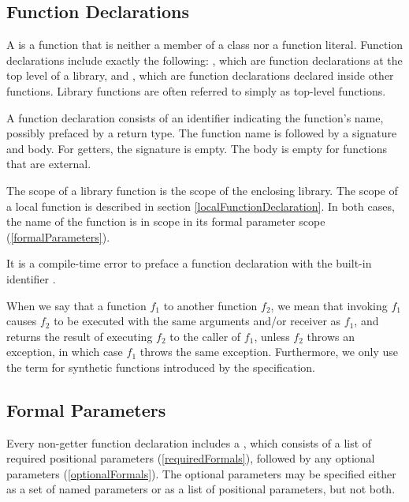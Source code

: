 \documentclass[makeidx]{article}
\begin{document}
\subsection{Function Declarations}

\LMHash{}%
A  is a function that is neither a member of a class nor a function literal.
Function declarations include exactly the following:
,
which are function declarations
at the top level of a library, and
,
which are function declarations declared inside other functions.
Library functions are often referred to simply as top-level functions.

\LMHash{}%
A function declaration consists of an identifier indicating the function's name, possibly prefaced by a return type.
The function name is followed by a signature and body.
For getters, the signature is empty.
The body is empty for functions that are external.

\LMHash{}%
The scope of a library function is the scope of the enclosing library.
The scope of a local function is described in section \ref{localFunctionDeclaration}.
In both cases, the name of the function is in scope in its formal parameter scope (\ref{formalParameters}).

\LMHash{}%
It is a compile-time error to preface a function declaration with the built-in identifier \STATIC{}.

\LMHash{}%
When we say that a function $f_1$  to another function $f_2$, we mean that invoking $f_1$ causes $f_2$ to be executed with the same arguments and/or receiver as $f_1$, and returns the result of executing $f_2$ to the caller of $f_1$, unless $f_2$ throws an exception, in which case $f_1$ throws the same exception.
Furthermore, we only use the term for synthetic functions introduced by the specification.


\subsection{Formal Parameters}

\LMHash{}%
Every non-getter function declaration includes a ,
which consists of a list of required positional parameters (\ref{requiredFormals}),
followed by any optional parameters (\ref{optionalFormals}).
The optional parameters may be specified either as a set of named parameters or as a list of positional parameters, but not both.
\end{document}
